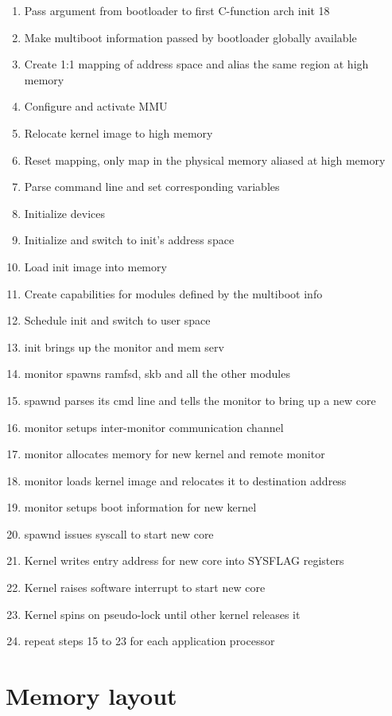 \documentclass[a4paper,twoside]{report} %
\begin{document}
\begin{enumerate}
\item Pass argument from bootloader to first C-function arch
  init 18
\item Make multiboot information passed by bootloader globally
  available
\item Create 1:1 mapping of address space and alias the same region at
  high memory
\item Configure and activate MMU
\item Relocate kernel image to high memory
\item Reset mapping, only map in the physical memory aliased at high
  memory
\item Parse command line and set corresponding variables
\item Initialize devices
\item Initialize and switch to init’s address space
\item Load init image into memory
\item Create capabilities for modules defined by the multiboot info
\item Schedule init and switch to user space
\item init brings up the monitor and mem serv
\item monitor spawns ramfsd, skb and all the other modules
\item spawnd parses its cmd line and tells the monitor to bring up a
  new core
\item monitor setups inter-monitor communication channel
\item monitor allocates memory for new kernel and remote monitor
\item monitor loads kernel image and relocates it to destination
  address
\item monitor setups boot information for new kernel
\item spawnd issues syscall to start new core
\item Kernel writes entry address for new core into SYSFLAG registers
\item Kernel raises software interrupt to start new core
\item Kernel spins on pseudo-lock until other kernel releases it
\item repeat steps 15 to 23 for each application processor
\end{enumerate}

\section{Memory layout}
\end{document}
